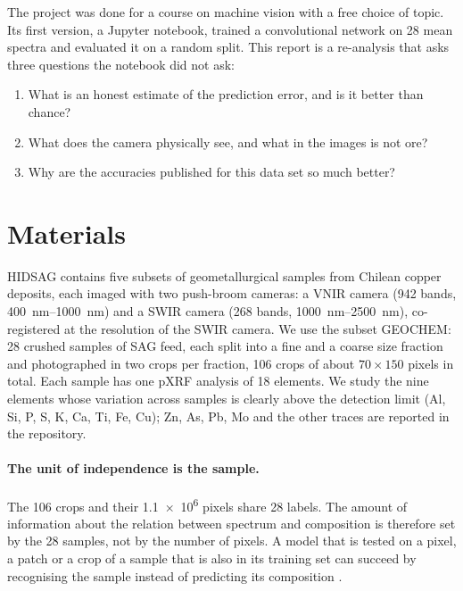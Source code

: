 \documentclass[11pt,a4paper]{article}
\begin{document}
The project was done for a course on machine vision with a free choice of topic. Its first version, a Jupyter
notebook, trained a convolutional network on 28 mean spectra and evaluated it on a random split. This report is a
re-analysis that asks three questions the notebook did not ask:
\begin{enumerate}
  \item What is an honest estimate of the prediction error, and is it better than chance?
  \item What does the camera physically see, and what in the images is not ore?
  \item Why are the accuracies published for this data set so much better?
\end{enumerate}

\section{Materials}\label{sec:data}

HIDSAG \citep{Ehrenfeld2023,HIDSAGdata} contains five subsets of geometallurgical samples from Chilean copper
deposits, each imaged with two push-broom cameras: a VNIR camera (942 bands, \SIrange{400}{1000}{nm}) and a SWIR
camera (268 bands, \SIrange{1000}{2500}{nm}), co-registered at the resolution of the SWIR camera. We use the subset
GEOCHEM: 28 crushed samples of SAG feed, each split into a fine and a coarse size fraction and photographed in
two crops per fraction, 106 crops of about $70 \times 150$ pixels in total. Each sample has one pXRF analysis of
18 elements. We study the nine elements whose variation across samples is clearly above the detection limit
(Al, Si, P, S, K, Ca, Ti, Fe, Cu); Zn, As, Pb, Mo and the other traces are reported in the repository.

\paragraph{The unit of independence is the sample.} The 106 crops and their \num{1.1e6} pixels share 28 labels.
The amount of information about the relation between spectrum and composition is therefore set by the 28
samples, not by the number of pixels. A model that is tested on a pixel, a patch or a crop of a sample that is also
in its training set can succeed by recognising the sample instead of predicting its composition
\citep{Roberts2017,Kaufman2012}.
\end{document}
